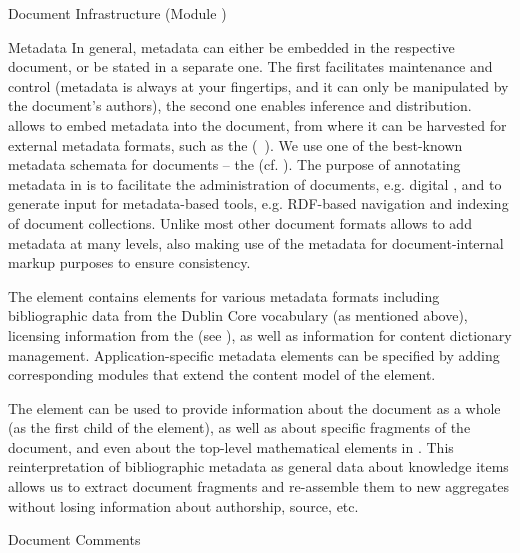 \begin{tchapter}[id=omdoc-infrastructure,short=Document Infrastructure]{Document Infrastructure (Module {})}
\begin{tsection}[id=metadata]{Metadata}
  In general, metadata can either be embedded in the respective document, or be stated in
  a separate one. The first facilitates maintenance and control (metadata is always at
  your fingertips, and it can only be manipulated by the document's authors), the second
  one enables inference and distribution. {\omdoc} allows to embed metadata into the
  document, from where it can be harvested for external metadata formats, such as the
   
  ({\rdf}~\cite{LasSwi:rdf99}).  We use one of the best-known metadata schemata for
  documents -- the {} (cf.  {}). The
  purpose of annotating metadata in {\omdoc} is to facilitate the administration of
  documents, e.g.  digital {}, and to generate input for
  metadata-based tools, e.g.  RDF-based navigation and indexing of document collections.
  Unlike most other document formats {\omdoc} allows to add metadata at many levels, also
  making use of the metadata for document-internal markup purposes to ensure consistency.
  
  The {} element contains elements for various metadata formats including
  bibliographic data from the Dublin Core vocabulary (as mentioned above), licensing
  information from the {} (see
  {}), as well as information for {\openmath} content dictionary
  management. Application-specific metadata elements can be specified by adding
  corresponding {\omdoc} modules that extend the content model of the {}
  element.

  The {\omdoc} {} element can be used to provide information about the
  document as a whole (as the first child of the {} element), as well as
  about specific fragments of the document, and even about the top-level mathematical
  elements in {\omdoc}. This reinterpretation of bibliographic metadata as general data
  about knowledge items allows us to extract document fragments and re-assemble them to
  new aggregates without losing information about authorship, source, etc.
\end{tsection}

\begin{tsection}[id=comments]{Document Comments}
  

\end{tsection}
\end{tchapter}
